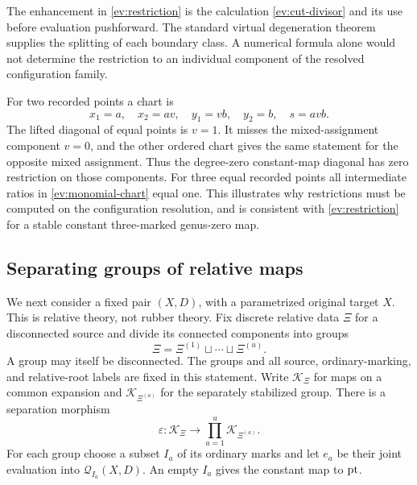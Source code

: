 \begin{remark}
\label{ev:refinement-not-numerical}
The enhancement in \cref{ev:restriction} is the calculation
\eqref{ev:cut-divisor} and its use before evaluation pushforward.
The standard virtual degeneration theorem supplies the splitting
of each boundary class.  A numerical formula alone would not
determine the restriction to an individual component of the
resolved configuration family.
\end{remark}

\begin{example}
\label{ev:diagonal-example}
For two recorded points a chart is
\[
 x_1=a,\quad x_2=av,\quad y_1=vb,\quad y_2=b,\quad s=avb.
\]
The lifted diagonal of equal points is $v=1$.  It misses the
mixed-assignment component $v=0$, and the other ordered chart gives
the same statement for the opposite mixed assignment.  Thus the
degree-zero constant-map diagonal has zero restriction on those
components.  For three equal recorded points all intermediate
ratios in \eqref{ev:monomial-chart} equal one.  This illustrates
why restrictions must be computed on the configuration resolution,
and is consistent with \cref{ev:restriction} for a stable constant
three-marked genus-zero map.
\end{example}

\subsection{Separating groups of relative maps}

We next consider a fixed pair $(X,D)$, with a parametrized original
target $X$.  This is relative theory, not rubber theory.  Fix
discrete relative data $\Xi$ for a disconnected source and divide
its connected components into groups
\[
  \Xi=\Xi^{(1)}\sqcup\cdots\sqcup\Xi^{(u)}.
\]
A group may itself be disconnected.  The groups and all source,
ordinary-marking, and relative-root labels are fixed in this
statement.  Write $\mathcal K_\Xi$ for maps on a common expansion
and $\mathcal K_{\Xi^{(a)}}$ for the separately stabilized group.
There is a separation morphism
\begin{equation}
\label{ev:separation}
 \varepsilon:\mathcal K_\Xi\longrightarrow
 \prod_{a=1}^u\mathcal K_{\Xi^{(a)}}.
\end{equation}
For each group choose a subset $I_a$ of its ordinary marks and let
$e_a$ be their joint evaluation into
$\mathcal Q_{I_a}(X,D)$.  An empty $I_a$ gives the constant map to
$\mathrm{pt}$.


